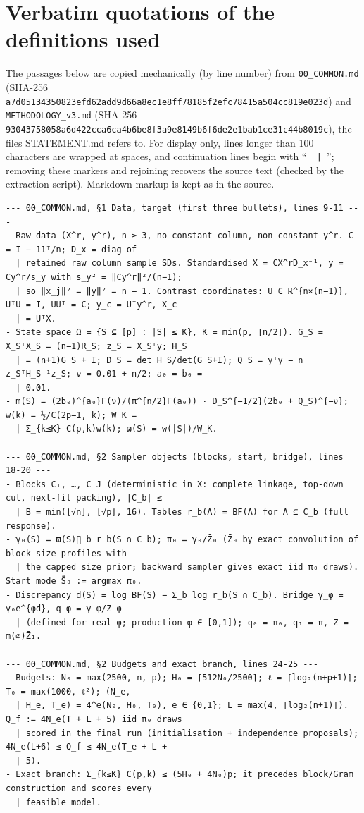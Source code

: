 \documentclass[11pt]{article}
\theoremstyle{remark}
\begin{document}
\section{Verbatim quotations of the definitions used}
The passages below are copied mechanically (by line number) from \texttt{00\_COMMON.md} (SHA-256 \texttt{a7d05134350823efd62add9d66a8ec1e8ff78185f2efc78415a504cc819e023d}) and \texttt{METHODOLOGY\_v3.md} (SHA-256 \texttt{93043758058a6d422cca6ca4b6be8f3a9e8149b6f6de2e1bab1ce31c44b8019c}), the files STATEMENT.md refers to. For display only, lines longer than 100 characters are wrapped at spaces, and continuation lines begin with ``\texttt{\ \ |\ }''; removing these markers and rejoining recovers the source text (checked by the extraction script). Markdown markup is kept as in the source.
\begin{Verbatim}[fontsize=\footnotesize,formatcom=\qfont]
--- 00_COMMON.md, §1 Data, target (first three bullets), lines 9-11 ---
- Raw data (X^r, y^r), n ≥ 3, no constant column, non-constant y^r. C = I − 11ᵀ/n; D_x = diag of
  | retained raw column sample SDs. Standardised X = CX^rD_x⁻¹, y = Cy^r/s_y with s_y² = ‖Cy^r‖²/(n−1);
  | so ‖x_j‖² = ‖y‖² = n − 1. Contrast coordinates: U ∈ ℝ^{n×(n−1)}, UᵀU = I, UUᵀ = C; y_c = Uᵀy^r, X_c
  | = UᵀX.
- State space Ω = {S ⊆ [p] : |S| ≤ K}, K = min(p, ⌊n/2⌋). G_S = X_SᵀX_S = (n−1)R_S; z_S = X_Sᵀy; H_S
  | = (n+1)G_S + I; D_S = det H_S/det(G_S+I); Q_S = yᵀy − n z_SᵀH_S⁻¹z_S; ν = 0.01 + n/2; a₀ = b₀ =
  | 0.01.
- m(S) = (2b₀)^{a₀}Γ(ν)/(π^{n/2}Γ(a₀)) · D_S^{−1/2}(2b₀ + Q_S)^{−ν}; w(k) = ½/C(2p−1, k); W_K =
  | Σ_{k≤K} C(p,k)w(k); ϖ(S) = w(|S|)/W_K.

--- 00_COMMON.md, §2 Sampler objects (blocks, start, bridge), lines 18-20 ---
- Blocks C₁, …, C_J (deterministic in X: complete linkage, top-down cut, next-fit packing), |C_b| ≤
  | B = min(⌊√n⌋, ⌊√p⌋, 16). Tables r_b(A) = BF(A) for A ⊆ C_b (full response).
- γ₀(S) = ϖ(S)∏_b r_b(S ∩ C_b); π₀ = γ₀/Z̄₀ (Z̄₀ by exact convolution of block size profiles with
  | the capped size prior; backward sampler gives exact iid π₀ draws). Start mode S̃₀ := argmax π₀.
- Discrepancy d(S) = log BF(S) − Σ_b log r_b(S ∩ C_b). Bridge γ_φ = γ₀e^{φd}, q_φ = γ_φ/Z̄_φ
  | (defined for real φ; production φ ∈ [0,1]); q₀ = π₀, q₁ = π, Z = m(∅)Z̄₁.

--- 00_COMMON.md, §2 Budgets and exact branch, lines 24-25 ---
- Budgets: N₀ = max(2500, n, p); H₀ = ⌈512N₀/2500⌉; ℓ = ⌈log₂(n+p+1)⌉; T₀ = max(1000, ℓ²); (N_e,
  | H_e, T_e) = 4^e(N₀, H₀, T₀), e ∈ {0,1}; L = max(4, ⌈log₂(n+1)⌉). Q_f := 4N_e(T + L + 5) iid π₀ draws
  | scored in the final run (initialisation + independence proposals); 4N_e(L+6) ≤ Q_f ≤ 4N_e(T_e + L +
  | 5).
- Exact branch: Σ_{k≤K} C(p,k) ≤ (5H₀ + 4N₀)p; it precedes block/Gram construction and scores every
  | feasible model.


\end{Verbatim}
\end{document}
